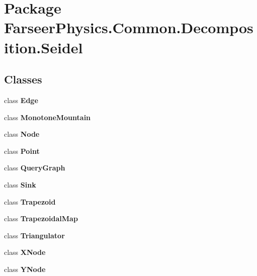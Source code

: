 \hypertarget{namespace_farseer_physics_1_1_common_1_1_decomposition_1_1_seidel}{\section{Package Farseer\+Physics.\+Common.\+Decomposition.\+Seidel}
\label{namespace_farseer_physics_1_1_common_1_1_decomposition_1_1_seidel}
}
\subsection*{Classes}
\begin{DoxyCompactItemize}
\item 
class {\bfseries Edge}
\item 
class {\bfseries Monotone\+Mountain}
\item 
class {\bfseries Node}
\item 
class {\bfseries Point}
\item 
class {\bfseries Query\+Graph}
\item 
class {\bfseries Sink}
\item 
class {\bfseries Trapezoid}
\item 
class {\bfseries Trapezoidal\+Map}
\item 
class {\bfseries Triangulator}
\item 
class {\bfseries X\+Node}
\item 
class {\bfseries Y\+Node}
\end{DoxyCompactItemize}
